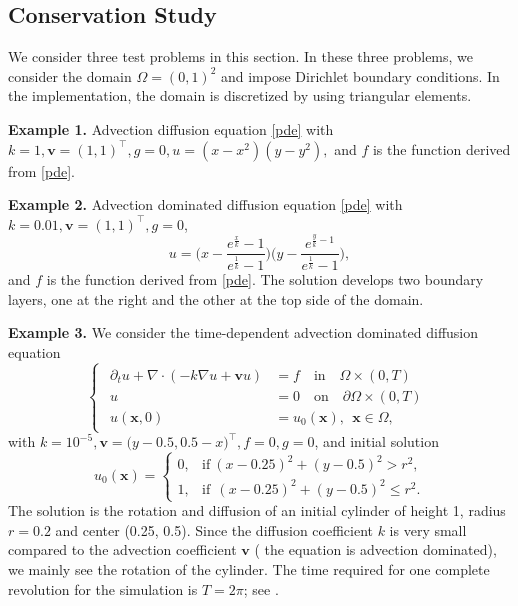 \documentclass[times]{nlaauth}
\numberwithin{equation}{section}
\begin{document}
\subsection{Conservation Study} \label{sec:cs}

We consider three test problems in this section. In these three problems, we consider the domain $\Omega = (0, 1)^2$ and impose Dirichlet boundary conditions. In the implementation, the domain is discretized by using triangular elements. 

\textbf{Example 1.} Advection diffusion equation \eqref{pde} with $k=1, \boldsymbol{v} = (1, 1)^\top, g = 0, u = (x-x^2) (y-y^2),$ and $f$ is the function derived from \eqref{pde}.

\textbf{Example 2.} Advection dominated diffusion equation \eqref{pde} with $k = 0.01, \boldsymbol{v} = (1, 1)^\top, g = 0$,
$$
u = \Big( x - \frac{e^{ \frac{x} {k} } - 1}{e^{\frac{1} {k}} - 1 } \Big) \Big( y - \frac{e^{\frac{y} {k} - 1} }{e^{\frac{1} {k}} - 1 } \Big),
$$ 
and $f$ is the function derived from \eqref{pde}. The solution develops two boundary layers, one at the right and the other at the top side of the domain. 

\textbf{Example 3.} We consider the time-dependent advection dominated diffusion equation
\begin{equation}\label{tpde}
\begin{cases}
\begin{aligned}
\partial_t u + \nabla \cdot ( - k \nabla u + \boldsymbol{v} u ) & = f \quad \text{in} \quad \Omega\times(0, T)  \\
u & = 0 \quad \text{on} \quad \partial\Omega\times(0, T)  \\
u(\boldsymbol{x}, 0) & = u_0(\boldsymbol{x}), ~~\boldsymbol{x} \in \Omega,
\end{aligned}
\end{cases}
\end{equation}
with $k = 10^{-5}, \boldsymbol{v} = \big( y - 0.5 , 0.5 - x  \big)^\top, f = 0, g = 0$, and initial solution  		
\begin{equation*}
u_0(\boldsymbol{x}) = 
	\begin{cases}
	0, &  \text{if} \ (x - 0.25)^2 + (y - 0.5)^2 > r^2, \\
	1, &  \text{if} \ \ (x - 0.25)^2 + (y - 0.5)^2 \leq r^2.
	\end{cases}
\end{equation*}
The solution is the rotation and diffusion of an initial cylinder of height 1, radius $r = 0.2$ and center (0.25, 0.5). Since the diffusion coefficient $k$ is very small compared to the advection coefficient $\boldsymbol{v}$ ( the equation is advection dominated), we mainly see the rotation of the cylinder.  The time required for one complete revolution for the simulation is $T = 2 \pi$; see \cite{bochev2013new}.
\end{document}
